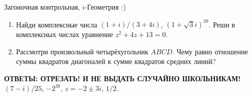 \documentclass[12pt,a4paper]{article}
\begin{document}
Загоночная контрольная, $i$-Геометрия :)

\begin{enumerate}
\item Найди комплексные числа  $(1+i)/(3+4i)$, $(1+\sqrt{3}i)^{39}$. Реши в комплексных числах уравнение $z^2+4z+13=0$.
\item Рассмотри произвольный четырёхугольник $ABCD$. Чему равно отношение суммы квадратов диагоналей к сумме квадратов средних линий?
\end{enumerate}

\textbf{ОТВЕТЫ: ОТРЕЗАТЬ! И НЕ ВЫДАТЬ СЛУЧАЙНО ШКОЛЬНИКАМ!}  $(7-i)/25$, $-2^{39}$, $z=-2 \pm 3i$, $1/2$.
\end{document}
